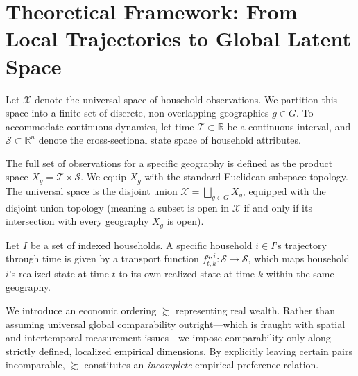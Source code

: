 \documentclass{article}
\begin{document}
\section*{Theoretical Framework: From Local Trajectories to Global Latent Space}

Let $\mathcal{X}$ denote the universal space of household observations. We partition
this space into a finite set of discrete, non-overlapping geographies $g \in G$. To
accommodate continuous dynamics, let time $\mathcal{T} \subset \mathbb{R}$ be a
continuous interval, and $\mathcal{S} \subset \mathbb{R}^n$ denote the cross-sectional
state space of household attributes.

The full set of observations for a specific geography is defined as the product space
$X_g = \mathcal{T} \times \mathcal{S}$. We equip $X_g$ with the standard Euclidean
subspace topology. The universal space is the disjoint union
$\mathcal{X} = \bigsqcup_{g \in G} X_g$, equipped with the disjoint union topology
(meaning a subset is open in $\mathcal{X}$ if and only if its intersection with every
geography $X_g$ is open).

Let $I$ be a set of indexed households. A specific household $i \in I$'s trajectory
through time is given by a transport function $f^{g,i}_{t,k} : \mathcal{S} \to \mathcal{S}$,
which maps household $i$'s realized state at time $t$ to its own realized state at time
$k$ within the same geography.

We introduce an economic ordering $\succsim$ representing real wealth. Rather than
assuming universal global comparability outright---which is fraught with spatial and
intertemporal measurement issues---we impose comparability only along strictly defined,
localized empirical dimensions. By explicitly leaving certain pairs incomparable,
$\succsim$ constitutes an \textit{incomplete} empirical preference relation.
\end{document}
